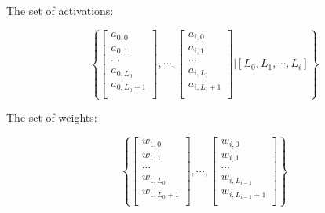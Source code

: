 \documentclass[8pt]{amsart}
\begin{document}
The set of activations:

\[
\left\{
    \begin{bmatrix}
        a_{0, 0} \\
        a_{0, 1} \\
        \cdots{} \\
        a_{0, L_0} \\
        a_{0, L_0 + 1} \\
    \end{bmatrix},
    \cdots{},
    \begin{bmatrix}
        a_{i, 0} \\
        a_{i, 1} \\
        \cdots{} \\
        a_{i, L_i} \\
        a_{i, L_i + 1} \\
    \end{bmatrix} \vert
    \left[ L_0, L_1, \cdots{}, L_i \right]
\right\}
\]

The set of weights:

\[
\left\{
    \begin{bmatrix}
        w_{1, 0} \\
        w_{1, 1} \\
        \cdots{} \\
        w_{1, L_0} \\
        w_{1, L_0 + 1} \\
    \end{bmatrix},
    \cdots{},
    \begin{bmatrix}
        w_{i, 0} \\
        w_{i, 1} \\
        \cdots{} \\
        w_{i, L_{i - 1}} \\
        w_{i, L_{i - 1} + 1} \\
    \end{bmatrix}
\right\}
\]
\end{document}
